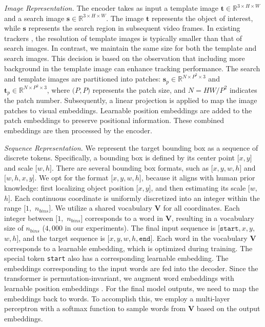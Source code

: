 \textit{Image Representation.}
The encoder takes as input a template image $\bm{t} \in {\mathbb{R}}^{3\times{H}\times{W}}$ and a search image $\bm{s} \in {\mathbb{R}}^{3\times{H}\times{W}}$. 
The image $\bm{t}$ represents the object of interest, while $\bm{s}$ represents the search region in subsequent video frames. In existing trackers \cite{SiameseFC, SiameseRPN, transt, Stark}, the resolution of template images is typically smaller than that of search images. 
In contrast, we maintain the same size for both the template and search images. This decision is based on the observation that including more background in the template image can enhance tracking performance.
The search and template images are partitioned into patches: $\bm{s}_p \in {\mathbb{R}}^{N \times {P^2 \times 3}}$ and $\bm{t}_p \in {\mathbb{R}}^{N \times {P^2 \times 3}}$, where $(P,$$P)$ represents the patch size, and $N$$=$$HW$$/$$P^2$ indicates the patch number. Subsequently, a linear projection is applied to map the image patches to visual embeddings. 
Learnable position embeddings \cite{2017Attention} are added to the patch embeddings to preserve positional information. These combined embeddings are then processed by the encoder.

\textit{Sequence Representation.}
We represent the target bounding box as a sequence of discrete tokens.
Specifically, a bounding box is defined by its center point $[x,$$y]$ and scale $[w,$$h]$.
There are several bounding box formats, such as $[x,$$y,$$w,$$h]$ and $[w,$$h,$$x,$$y]$.
We opt for the format $[x,$$y,$$w,$$h]$, because it aligns with human prior knowledge: first localizing object position $[x,$$y]$, and then estimating its scale $[w,$$h]$.
Each continuous coordinate is uniformly discretized into an integer within the range $[1,$ $n_{bins}]$.
We utilize a shared vocabulary $\bm{V}$ for all coordinates. Each integer between $[1,$ $n_{bins}]$ corresponds to a word in $\bm{V}$, resulting in a vocabulary size of $n_{bins}$ ($4,000$ in our experiments). The final input sequence is $[\texttt{start},$$x,$$y,$$w,$$h]$, and the target sequence is $[x,$$y,$$w,$$h,$$\texttt{end}]$.
Each word in the vocabulary $\bm{V}$ corresponds to a learnable embedding, which is optimized during training.
The special token \texttt{start} also has a corresponding learnable embedding.
The embeddings corresponding to the input words are fed into the decoder.
Since the transformer is permutation-invariant, we augment word embeddings with learnable position embeddings \cite{2017Attention}. For the final model outputs, we need to map the embeddings back to words. To accomplish this, we employ a multi-layer perceptron with a softmax function to sample words from $\bm{V}$ based on the output embeddings. 

